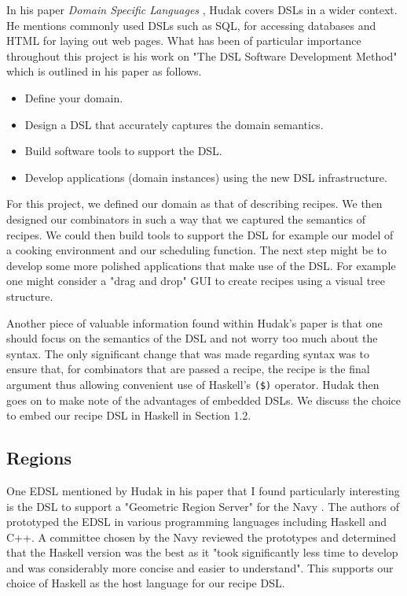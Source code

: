 \documentclass[11pt]{article}
\begin{document}
In his paper \textit{Domain Specific Languages} \cite{hudak}, Hudak covers DSLs
in a wider context. He mentions commonly used DSLs such as SQL, for accessing
databases and HTML for laying out web pages. What has been of particular importance
throughout this project is his work on "The DSL Software Development Method" which
is outlined in his paper as follows.

\begin{itemize}
    \item Define your domain.
    \item Design a DSL that accurately captures the domain semantics.
    \item Build software tools to support the DSL.
    \item Develop applications (domain instances) using the new DSL
    infrastructure.
\end{itemize}

For this project, we defined our domain as that of describing recipes. We then designed our
combinators in such a way that we captured the semantics of recipes. We could then
build tools to support the DSL for example our model of a cooking environment
and our scheduling function. The next step might be to develop some more
polished applications that make use of the DSL. For example one might consider
a "drag and drop" GUI to create recipes using a visual tree structure.

\medbreak

Another piece of valuable information found within Hudak's paper is that
one should focus on the semantics of the DSL and not worry too much about
the syntax. The only significant change that was made regarding syntax was
to ensure that, for combinators that are passed a recipe, the recipe is the
final argument thus allowing convenient use of Haskell's \texttt{(\$)} operator.
Hudak then goes on to make note of the advantages of embedded DSLs. We discuss
the choice to embed our recipe DSL in Haskell in Section 1.2.

\subsection{Regions}

One EDSL mentioned by Hudak in his paper \cite{hudak} that I found particularly
interesting is the DSL to support a "Geometric Region Server" for the Navy \cite{regions}.
The authors of \cite{regions} prototyped the EDSL in various programming languages
including Haskell and C++. A committee chosen by the Navy reviewed the prototypes and
determined that the Haskell version was the best as it "took significantly less time to
develop and was considerably more concise and easier to understand". This supports
our choice of Haskell as the host language for our recipe DSL.
\end{document}
